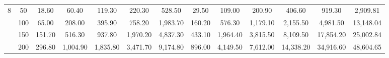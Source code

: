 \begin{table}[htbp]
\begin{adjustbox}{angle=90}
{\begin{tabular}{|c|c|c|c|c|c|c|c|c|c|c|c|c|}
    8 & 50 & 18.60 & 60.40 & 119.30 & 220.30 & 528.50 & 29.50 & 109.00 & 200.90 & 406.60 & 919.30 & 2,909.81 \\
     & 100 & 65.00 & 208.00 & 395.90 & 758.20 & 1,983.70 & 160.20 & 576.30 & 1,179.10 & 2,155.50 & 4,981.50 & 13,148.04 \\
     & 150 & 151.70 & 516.30 & 937.80 & 1,970.20 & 4,837.30 & 433.10 & 1,964.40 & 3,815.50 & 8,109.50 & 17,854.20 & 25,002.84 \\
     & 200 & 296.80 & 1,004.90 & 1,835.80 & 3,471.70 & 9,174.80 & 896.00 & 4,149.50 & 7,612.00 & 14,338.20 & 34,916.60 & 48,604.65 \\ \hline
    \end{tabular}}
    \end{adjustbox}
    \label{exp:literature_all_times}
    \end{table}
    